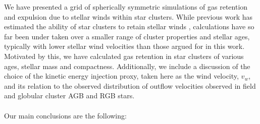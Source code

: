 \documentclass[fleqn,usenatbib]{mnras}
\begin{document}
 We have presented a grid of spherically symmetric simulations of gas retention and expulsion due to stellar winds within star clusters.
 While previous work has estimated the ability of star clusters to retain stellar winds \citep{dercole2008,dercole2010,vesperini2010,conroy2011b,conroy2011a}, calculations have so far been under taken over a smaller range of cluster properties and stellar ages, typically with lower stellar wind velocities than those argued for in this work.
 Motivated by this, we have calculated gas retention in  star clusters of various ages, stellar mass and compactness.  
 Additionally, we include a discussion of the choice of the kinetic energy injection proxy, taken here as the wind velocity, $v_w$, and its relation to the observed distribution of outflow velocities observed in field and globular cluster AGB and RGB stars.  \\
 \\
\noindent Our main conclusions are the following:
\end{document}
